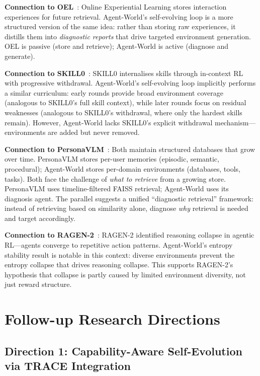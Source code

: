 \documentclass[11pt]{article}
\begin{document}
\textbf{Connection to OEL}~\cite{oel}: Online Experiential Learning stores interaction experiences for future retrieval. Agent-World's self-evolving loop is a more structured version of the same idea: rather than storing raw experiences, it distills them into \textit{diagnostic reports} that drive targeted environment generation. OEL is passive (store and retrieve); Agent-World is active (diagnose and generate).

\textbf{Connection to SKILL0}~\cite{skill0}: SKILL0 internalises skills through in-context RL with progressive withdrawal. Agent-World's self-evolving loop implicitly performs a similar curriculum: early rounds provide broad environment coverage (analogous to SKILL0's full skill context), while later rounds focus on residual weaknesses (analogous to SKILL0's withdrawal, where only the hardest skills remain). However, Agent-World lacks SKILL0's explicit withdrawal mechanism---environments are added but never removed.

\textbf{Connection to PersonaVLM}~\cite{personavlm}: Both maintain structured databases that grow over time. PersonaVLM stores per-user memories (episodic, semantic, procedural); Agent-World stores per-domain environments (databases, tools, tasks). Both face the challenge of \textit{what to retrieve} from a growing store. PersonaVLM uses timeline-filtered FAISS retrieval; Agent-World uses its diagnosis agent. The parallel suggests a unified ``diagnostic retrieval'' framework: instead of retrieving based on similarity alone, diagnose \textit{why} retrieval is needed and target accordingly.

\textbf{Connection to RAGEN-2}~\cite{ragen2}: RAGEN-2 identified reasoning collapse in agentic RL---agents converge to repetitive action patterns. Agent-World's entropy stability result is notable in this context: diverse environments prevent the entropy collapse that drives reasoning collapse. This supports RAGEN-2's hypothesis that collapse is partly caused by limited environment diversity, not just reward structure.

\section{Follow-up Research Directions}

\subsection{Direction 1: Capability-Aware Self-Evolution via TRACE Integration}
\end{document}
